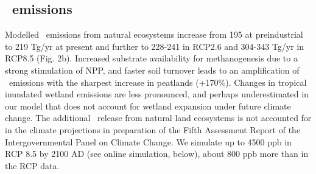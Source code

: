 \documentclass{myreport}
\begin{document}

\subsection{\chh\ emissions}
\label{sec:eCH4}

Modelled \chh\ emissions from natural ecosystems increase from 195 at preindustrial to 219 Tg\chh /yr at present and further to 228-241 in RCP2.6 and 304-343 Tg\chh /yr in RCP8.5 (Fig. 2b). Increased substrate availability for methanogenesis due to a strong stimulation of NPP, and faster soil turnover leads to an amplification of \chh\ emissions with the sharpest increase in peatlands (+170\%). Changes in tropical inundated wetland emissions are less pronounced, and perhaps underestimated in our model that does not account for wetland expansion under future climate change\cite{shindell04grl}. The additional \chh\ release from natural land ecosystems is not accounted for in the climate projections in preparation of the Fifth Assessment Report of the Intergovernmental Panel on Climate Change\cite{RCPdatabase, CMIP5}. We simulate up to 4500 ppb in RCP 8.5 by 2100 AD (see online simulation, below), about 800 ppb more than in the RCP data.

\end{document}
